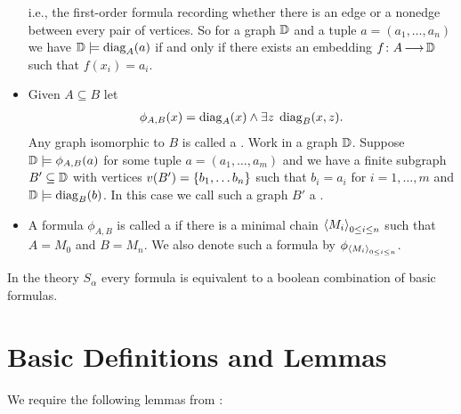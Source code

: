 \begin{Definition}
\begin{itemize}
    i.e., the first-order formula recording whether there is an edge or a nonedge between every pair of vertices.
    So for a graph $\mathbb D$ and a tuple $a = (a_1, \ldots, a_n)$ we have $\mathbb D \models \operatorname{diag}_A(a)$ if and only if
    there exists an embedding $f \colon A \operatorname{\longrightarrow} \mathbb D$ such that $f(x_i) = a_i$.
  \item Given $A \subseteq B$ let 
    \begin{align*}
      \phi_{A,B}(x) = \operatorname{diag}_A(x) \wedge \exists z \; \operatorname{diag}_B(x, z).
    \end{align*}
    Any graph isomorphic to $B$ is called a .
    Work in a graph $\mathbb D$.
    Suppose $\mathbb D \models \phi_{A,B}(a)$ for some tuple $a = (a_1, \ldots, a_m)$
    and we have a finite subgraph $B' \subseteq \mathbb D$ with vertices $v(B') = \left\{b_1, \ldots b_n\right\}$
    such that $b_i = a_i$ for $i = 1, \ldots, m$ and $\mathbb D \models \operatorname{diag}_B(b)$.
    In this case we call such a graph $B'$ a .
  \item A formula $\phi_{A,B}$ is called a 
    if there is a minimal chain $\left\langle M_i \right\rangle_{0 \leq i \leq n}$
    such that $A = M_0$ and $B = M_n$.
    We also denote such a formula by $\phi_{\left\langle M_i \right\rangle_{0 \leq i \leq n}}$. 
  \end{itemize}
\end{Definition}
 
\begin{Theorem} 
  In the theory $S_\alpha$ every formula is equivalent to a boolean combination of basic formulas.
\end{Theorem}

\section{Basic Definitions and Lemmas}
We require the following lemmas from \cite{laskowski}:

